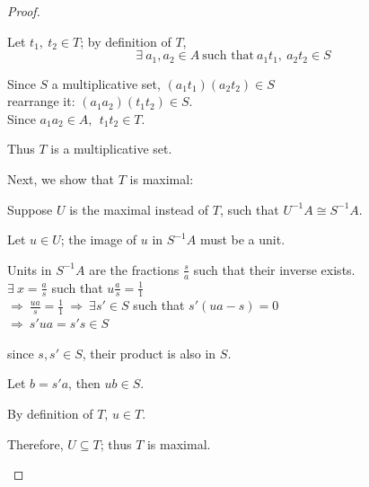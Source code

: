 \documentclass{article}
\theoremstyle{definition}
\begin{document}
\begin{proof}
\begin{enumerate}[a.]
    Let $t_1,~ t_2 \in T$; by definition of $T$,
    $$\exists~ a_1, a_2 \in A ~\text{such that}~ a_1 t_1,~ a_2 t_2 \in S$$

    Since $S$ a multiplicative set, $(a_1 t_1)(a_2 t_2) \in S$\\
    rearrange it: $(a_1 a_2)(t_1 t_2) \in S$.\\
    Since $a_1 a_2 \in A,~~ t_1 t_2 \in T$.

    Thus $T$ is a multiplicative set.

    Next, we show that $T$ is maximal:

    Suppose $U$ is the maximal instead of $T$, such that $U^{-1}A \cong S^{-1}A$.

    Let $u \in U$; the image of $u$ in $S^{-1}A$ must be a unit.

    Units in $S^{-1}A$ are the fractions $\frac{s}{a}$ such that their inverse exists.\\
    \hspace*{2em} $\exists~ x=\frac{a}{s}$ such that $u \frac{a}{s} = \frac{1}{1}$\\
    \hspace*{2em} $\Longrightarrow~ \frac{ua}{s} = \frac{1}{1} ~\Longrightarrow~ \exists s' \in S$ such that $s'(ua-s)=0$\\
    $\Longrightarrow~ s'ua=s's \in S$

    since $s,s' \in S$, their product is also in $S$.

    Let $b=s'a$, then $ub \in S$.

    By definition of $T$, $u \in T$.

    Therefore, $U \subseteq T$; thus $T$ is maximal.
\end{enumerate}
\end{proof}




\end{document}
